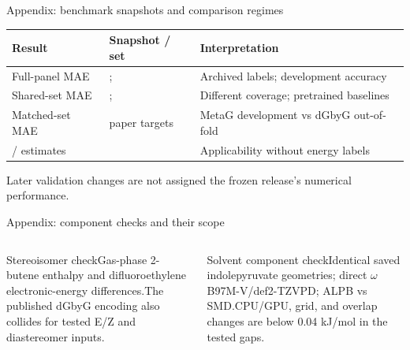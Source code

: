\begin{frame}{Appendix: benchmark snapshots and comparison regimes}
\small\renewcommand{\arraystretch}{1.8}
\begin{tabular}{@{}>{\raggedright\arraybackslash}p{3.5cm}>{\raggedright\arraybackslash}p{3.5cm}>{\raggedright\arraybackslash}p{6.0cm}@{}}
\toprule
Result & Snapshot / set & Interpretation\\\midrule
Full-panel MAE \AccuracyMAE{} & \AccuracySnapshot{}; \AccuracyN{} & Archived labels; development accuracy\\
Shared-set MAE \SharedMAE{} & \ComparisonSnapshot{}; \SharedN{} & Different coverage; pretrained baselines\\
Matched-set MAE \MatchedMetaGMAE{} & \MatchedN{} paper targets & MetaG development vs dGbyG out-of-fold\\
\ApplicationScored{} / \ApplicationN{} estimates & \ApplicabilitySnapshot{} & Applicability without energy labels\\\bottomrule
\end{tabular}
\gap
\small Later validation changes are not assigned the frozen release's numerical performance.
\end{frame}

\begin{frame}{Appendix: component checks and their scope}
\begin{columns}[T]
\begin{block}{Stereoisomer check}\small Gas-phase 2-butene enthalpy and difluoroethylene electronic-energy differences.\gap The published dGbyG encoding also collides for tested E/Z and diastereomer inputs.\end{block}
\begin{block}{Solvent component check}\small Identical saved indolepyruvate geometries; direct $\omega$B97M-V/def2-TZVPD; ALPB vs SMD.\gap CPU/GPU, grid, and overlap changes are below 0.04 kJ/mol in the tested gaps.\end{block}
\end{columns}
\gap{}
\end{frame}

